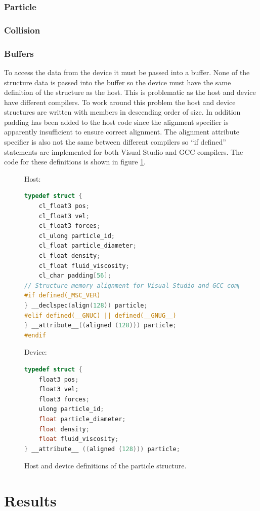 \documentclass[10pt,a4paper,titlepage]{report}
\begin{document}
\subsection{Particle}
\subsection{Collision}
\subsection{Buffers}
To access the data from the device it must be passed into a buffer. None of the structure data is passed into the buffer so the device must have the same definition of the structure as the host. This is problematic as the host and device have different compilers. To work around this problem the host and device structures are written with members in descending order of size. In addition padding has been added to the host code since the alignment specifier is apparently insufficient to ensure correct alignment. The alignment attribute specifier is also not the same between different compilers so ``if defined'' statements are implemented for both Visual Studio and GCC compilers. The code for these definitions is shown in figure \ref{fig:struct_definitions}.

\begin{figure}[!ht]
Host:
\begin{lstlisting}[language=C]
typedef struct {
    cl_float3 pos;
    cl_float3 vel;
    cl_float3 forces;
    cl_ulong particle_id;
    cl_float particle_diameter;
    cl_float density;
    cl_float fluid_viscosity;
    cl_char padding[56];
// Structure memory alignment for Visual Studio and GCC compilers.
#if defined(_MSC_VER)
} __declspec(align(128)) particle;
#elif defined(__GNUC) || defined(__GNUG__)
} __attribute__((aligned (128))) particle;
#endif
\end{lstlisting}
Device:
\begin{lstlisting}[language=C]
typedef struct {
    float3 pos;
    float3 vel;
    float3 forces;
    ulong particle_id;
    float particle_diameter;
    float density;
    float fluid_viscosity;
} __attribute__ ((aligned (128))) particle;
\end{lstlisting}
\caption{Host and device definitions of the particle structure.}
\label{fig:struct_definitions}
\end{figure}
\chapter{Results}
\end{document}
